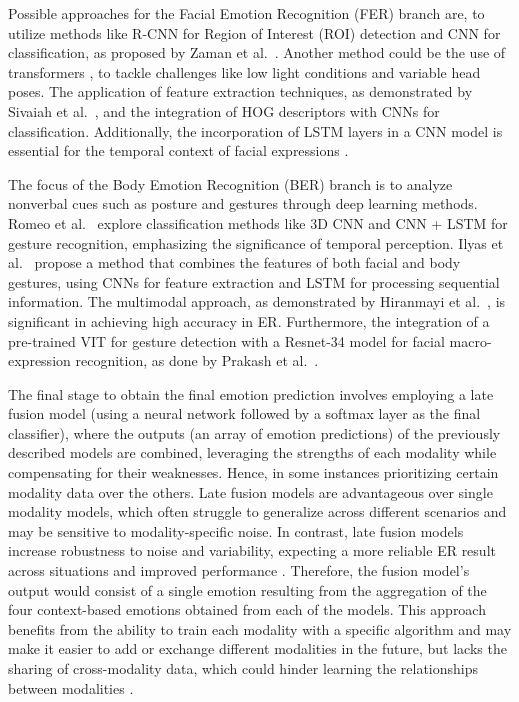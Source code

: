 \documentclass[runningheads]{llncs}
\begin{document}
Possible approaches for the Facial Emotion Recognition (FER) branch are, to utilize methods like R-CNN for Region of Interest (ROI) detection and CNN for classification, as proposed by Zaman et al.~\cite{Zaman2022}. Another method could be the use of transformers \cite{Yao2023}, to tackle challenges like low light conditions and variable head poses. The application of feature extraction techniques, as demonstrated by Sivaiah et al.~\cite{Bellamkonda2020}, and the integration of HOG descriptors with CNNs for classification. Additionally, the incorporation of LSTM layers in a CNN model is essential for the temporal context of facial expressions \cite{Mukhiddinov2023}.

The focus of the Body Emotion Recognition (BER) branch is to analyze nonverbal cues such as posture and gestures through deep learning methods. Romeo et al.~\cite{Romeo2021} explore classification methods like 3D CNN and CNN + LSTM for gesture recognition, emphasizing the significance of temporal perception. Ilyas et al.~\cite{Ilyas2021} propose a method that combines the features of both facial and body gestures, using CNNs for feature extraction and LSTM for processing sequential information. The multimodal approach, as demonstrated by Hiranmayi et al.~\cite{Ranganathan2016}, is significant in achieving high accuracy in ER. Furthermore, the integration of a pre-trained VIT for gesture detection with a Resnet-34 model for facial macro-expression recognition, as done by Prakash et al.~\cite{Prakash2023}.

The final stage to obtain the final emotion prediction involves employing a late fusion model (using a neural network followed by a softmax layer as the final classifier), where the outputs (an array of emotion predictions) of the previously described models are combined, leveraging the strengths of each modality while compensating for their weaknesses. Hence, in some instances prioritizing certain modality data over the others. Late fusion models are advantageous over single modality models, which often struggle to generalize across different scenarios and may be sensitive to modality-specific noise. In contrast, late fusion models increase robustness to noise and variability, expecting a more reliable ER result across situations and improved performance \cite{zhu_multimodal_2023, sleeman_multimodal_2022}. Therefore, the fusion model's output would consist of a single emotion resulting from the aggregation of the four context-based emotions obtained from each of the models. This approach benefits from the ability to train each modality with a specific algorithm and may make it easier to add or exchange different modalities in the future, but lacks the sharing of cross-modality data, which could hinder learning the relationships between modalities \cite{sleeman_multimodal_2022}.
\end{document}
